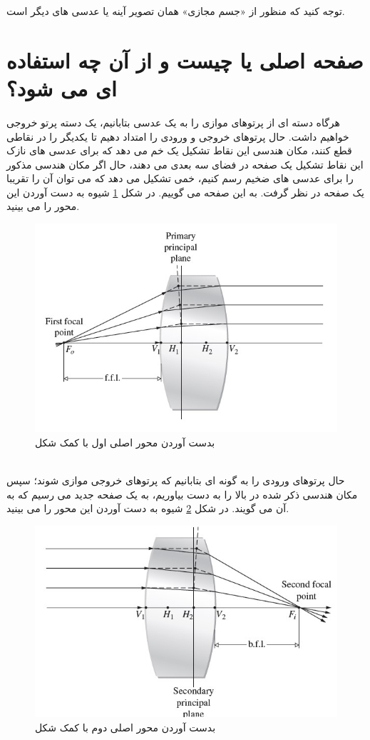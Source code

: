 \documentclass{article}
\begin{document}
توجه کنید که منظور از «جسم مجازی» همان تصویر آینه یا عدسی های دیگر است.
\section{صفحه اصلی یا 
چیست و از آن چه استفاده ای می شود؟}
هرگاه دسته ای از پرتوهای موازی را به یک عدسی بتابانیم، یک دسته پرتو خروجی خواهیم داشت. حال پرتوهای خروجی و ورودی را امتداد دهیم تا یکدیگر را در نقاطی قطع کنند، مکان هندسی این نقاط تشکیل یک خم می دهد که برای عدسی های نازک این نقاط تشکیل یک صفحه در فضای سه بعدی می دهند، حال اگر مکان هندسی مذکور را برای عدسی های ضخیم رسم کنیم، خمی تشکیل می دهد که می توان آن را تقریبا یک صفحه در نظر گرفت.
به این صفحه 
می گوییم. در شکل
\ref{Fig1}
شیوه به دست آوردن این محور را می بینید.
\begin{figure}[h]
	\centering
	\includegraphics[scale=0.8]{1.jpg}
	\caption{بدست آوردن محور اصلی اول با کمک شکل}
	\label{Fig1}
\end{figure}

\noindent\\
حال پرتوهای ورودی را به گونه ای بتابانیم که پرتوهای خروجی موازی شوند؛ سپس مکان هندسی ذکر شده در بالا را به دست بیاوریم، به یک صفحه جدید می رسیم که به آن 
می گویند.
در شکل
\ref{Fig2}
شیوه به دست آوردن این محور را می بینید.
\begin{figure}[h]
	\centering
	\includegraphics[scale=0.8]{3.jpg}
	\caption{بدست آوردن محور اصلی دوم با کمک شکل}
	\label{Fig2}
\end{figure}
\end{document}

